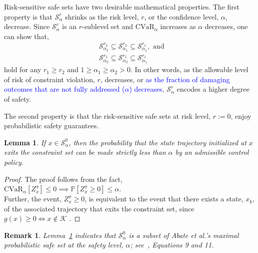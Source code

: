 \documentclass[letterpaper, 10 pt, conference]{ieeeconf}  %
\newtheorem{lemma}{Lemma}
\newtheorem{remark}{Remark}
\begin{document}
Risk-sensitive safe sets have two desirable mathematical properties.
The first property is that $\mathcal{S}_\alpha^r$ shrinks as the risk level, $r$, or the confidence level, $\alpha$, decrease.
Since $\mathcal{S}_\alpha^r$ is an $r$-sublevel set and $\text{CVaR}_\alpha$ increases as $\alpha$ decreases,
one can show that,
\begin{equation}\begin{aligned}
& \mathcal{S}_{\alpha_2}^{r_2} \subseteq \mathcal{S}_{\alpha_1}^{r_2} \subseteq \mathcal{S}_{\alpha_1}^{r_1}, \text{ and } \\
& \mathcal{S}_{\alpha_2}^{r_2} \subseteq \mathcal{S}_{\alpha_2}^{r_1} \subseteq \mathcal{S}_{\alpha_1}^{r_1}
\end{aligned}\end{equation}
hold for any $r_1 \geq r_2$ and $1 \geq \alpha_1 \geq \alpha_2 > 0$.
In other words, as the allowable level of risk of constraint violation, $r$, decreases, or
\textcolor{blue}{as the fraction of damaging outcomes that are not fully addressed ($\alpha$) decreases},
$\mathcal{S}_\alpha^r$ encodes a higher degree of safety.

The second property is that the risk-sensitive safe sets at risk level, $r := 0$, enjoy probabilistic safety guarantees.
\begin{lemma}\label{mylemma1}
If $x \in \mathcal{S}_\alpha^0$, then the probability that the state trajectory initialized at $x$ exits the constraint set can be made strictly
less than $\alpha$ by an admissible control policy.
\end{lemma}
\begin{proof}
The proof follows from the fact,\footnotemark \\
$\text{CVaR}_\alpha[Z_x^\pi] \leq 0 \implies \mathbb{P}[Z_x^\pi\geq 0] \leq \alpha$. \\
Further, the event, $Z_x^\pi\geq 0$, is equivalent to the event that there exists a state, $x_k$, of the associated trajectory 
that exits the constraint set, since $g(x) \geq 0 \iff x \notin \mathcal{K}$\footnotemark
{}.
\end{proof}
\begin{remark}{}
Lemma~\ref{mylemma1} indicates that $\mathcal{S}_\alpha^0$ is a subset of Abate et al.'s \textit{maximal probabilistic safe set} at the safety level, $\alpha$;
see~\cite{abate2008probabilistic}, Equations 9 and 11.
\end{remark}
\end{document}
